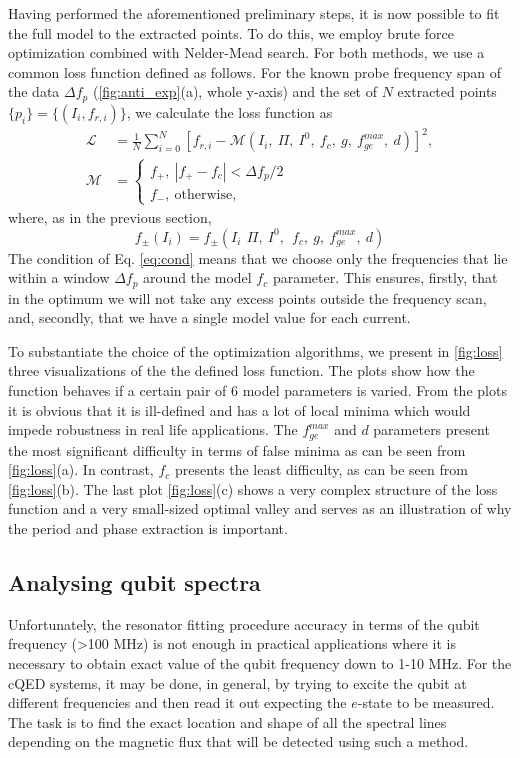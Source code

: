 \documentclass[%
 aip,
 amsmath,amssymb,
 reprint,%
]{revtex4-1}
\begin{document}
 
Having performed the aforementioned preliminary steps, it is now possible to fit the full model to the extracted points. To do this, we employ brute force optimization combined with Nelder-Mead\cite{nelder1965} search. For both methods, we use a common loss function defined as follows. For the known probe frequency span of the data $\Delta f_p$ (\autoref{fig:anti_exp}(a), whole y-axis) and the set of $N$ extracted points $\{p_i\} = \{(I_i, f_{r,i})\}$, we calculate the loss function as
\begin{align}
\mathcal{L} &= \frac{1}{N}\sum_{i=0}^N [f_{r,i} - \mathcal{M}(I_i,\ \Pi, \ I^0,\ f_c,\ g,\ f_{ge}^{max},\ d)]^2,\label{eq:loss}\\
\mathcal{M} &= \begin{cases}
f_+,\  |f_+ - f_c|< \Delta f_p/2 \\
f_-,\ \text{otherwise}, \label{eq:cond}
\end{cases}
\end{align}
where, as in the previous section, $$f_{\pm}(I_i) = f_{\pm}(I_i\,\ \Pi,\ I^0,\ \ f_c,\ g,\ f_{ge}^{max},\ d)$$
The condition of Eq. \eqref{eq:cond} means that we choose only the frequencies that lie within a window $\Delta f_p$ around the model $f_c$ parameter. This ensures, firstly, that in the optimum we will not take any excess points outside the frequency scan, and, secondly, that we have a single model value for each current.

To substantiate the choice of the optimization algorithms, we present in \autoref{fig:loss} three visualizations of the the defined loss function. The plots show how the function behaves if a certain pair of 6 model parameters is varied. From the plots it is obvious that it is ill-defined and has a lot of local minima which would impede robustness in real life applications. The $f^{max}_{ge}$ and $d$ parameters present the most significant difficulty in terms of false minima as can be seen from \autoref{fig:loss}(a). In contrast, $f_c$ presents the least difficulty, as can be seen from \autoref{fig:loss}(b). The last plot \autoref{fig:loss}(c) shows a very complex structure of the loss function and a very small-sized optimal valley and serves as an illustration of why the period and phase extraction is important.


\subsection{Analysing qubit spectra}


Unfortunately, the resonator fitting procedure accuracy in terms of the qubit frequency (>100 MHz) is not enough in practical applications where it is necessary to obtain exact value of the qubit frequency down to 1-10 MHz. For the cQED systems, it may be done, in general, by trying to excite the qubit at different frequencies and then read it out expecting the $e$-state to be measured. The task is to find the exact location and shape of all the spectral lines depending on the magnetic flux that will be detected using such a method. 
\end{document}
